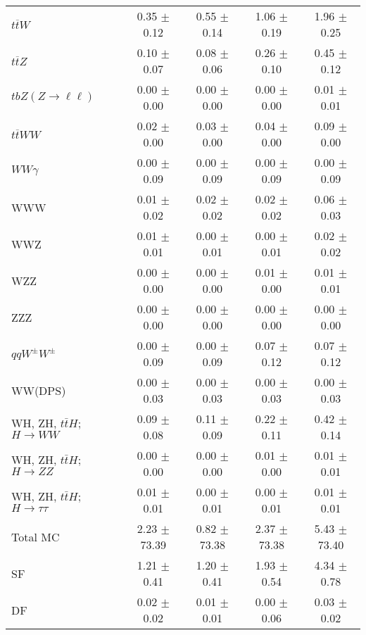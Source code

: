 \begin{tabular}{l|cccc}
                   $t\overline{t}W$ &  0.35 $\pm$  0.12 &  0.55 $\pm$  0.14 &  1.06 $\pm$  0.19 &  1.96 $\pm$  0.25 \\
                   $t\overline{t}Z$ &  0.10 $\pm$  0.07 &  0.08 $\pm$  0.06 &  0.26 $\pm$  0.10 &  0.45 $\pm$  0.12 \\
    $tbZ (Z \rightarrow \ell \ell)$ &  0.00 $\pm$  0.00 &  0.00 $\pm$  0.00 &  0.00 $\pm$  0.00 &  0.01 $\pm$  0.01 \\
                  $t\overline{t}WW$ &  0.02 $\pm$  0.00 &  0.03 $\pm$  0.00 &  0.04 $\pm$  0.00 &  0.09 $\pm$  0.00 \\
                         $WW\gamma$ &  0.00 $\pm$  0.09 &  0.00 $\pm$  0.09 &  0.00 $\pm$  0.09 &  0.00 $\pm$  0.09 \\
                                WWW &  0.01 $\pm$  0.02 &  0.02 $\pm$  0.02 &  0.02 $\pm$  0.02 &  0.06 $\pm$  0.03 \\
                                WWZ &  0.01 $\pm$  0.01 &  0.00 $\pm$  0.01 &  0.00 $\pm$  0.01 &  0.02 $\pm$  0.02 \\
                                WZZ &  0.00 $\pm$  0.00 &  0.00 $\pm$  0.00 &  0.01 $\pm$  0.00 &  0.01 $\pm$  0.01 \\
                                ZZZ &  0.00 $\pm$  0.00 &  0.00 $\pm$  0.00 &  0.00 $\pm$  0.00 &  0.00 $\pm$  0.00 \\
                 $qqW^{\pm}W^{\pm}$ &  0.00 $\pm$  0.09 &  0.00 $\pm$  0.09 &  0.07 $\pm$  0.12 &  0.07 $\pm$  0.12 \\
                            WW(DPS) &  0.00 $\pm$  0.03 &  0.00 $\pm$  0.03 &  0.00 $\pm$  0.03 &  0.00 $\pm$  0.03 \\
WH, ZH, $t\bar{t}H$; $H \rightarrow WW$ &  0.09 $\pm$  0.08 &  0.11 $\pm$  0.09 &  0.22 $\pm$  0.11 &  0.42 $\pm$  0.14 \\
WH, ZH, $t\bar{t}H$; $H \rightarrow ZZ$ &  0.00 $\pm$  0.00 &  0.00 $\pm$  0.00 &  0.01 $\pm$  0.00 &  0.01 $\pm$  0.01 \\
WH, ZH, $t\bar{t}H$; $H \rightarrow \tau\tau$ &  0.01 $\pm$  0.01 &  0.00 $\pm$  0.01 &  0.00 $\pm$  0.01 &  0.01 $\pm$  0.01 \\
\hline\hline
                           Total MC &  2.23 $\pm$ 73.39 &  0.82 $\pm$ 73.38 &  2.37 $\pm$ 73.38 &  5.43 $\pm$ 73.40 \\
\hline
                                 SF &  1.21 $\pm$  0.41 &  1.20 $\pm$  0.41 &  1.93 $\pm$  0.54 &  4.34 $\pm$  0.78 \\
                                 DF &  0.02 $\pm$  0.02 &  0.01 $\pm$  0.01 &  0.00 $\pm$  0.06 &  0.03 $\pm$  0.02 \\

\end{tabular}
